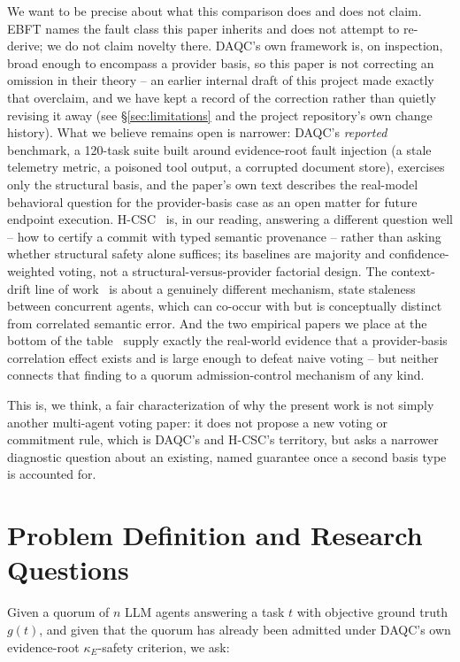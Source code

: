 \documentclass[journal]{IEEEtran}
\begin{document}
We want to be precise about what this comparison does and does not claim. EBFT names the fault class this paper inherits and does not attempt to re-derive; we do not claim novelty there. DAQC's own framework is, on inspection, broad enough to encompass a provider basis, so this paper is not correcting an omission in their theory -- an earlier internal draft of this project made exactly that overclaim, and we have kept a record of the correction rather than quietly revising it away (see \S\ref{sec:limitations} and the project repository's own change history). What we believe remains open is narrower: DAQC's \emph{reported} benchmark, a 120-task suite built around evidence-root fault injection (a stale telemetry metric, a poisoned tool output, a corrupted document store), exercises only the structural basis, and the paper's own text describes the real-model behavioral question for the provider-basis case as an open matter for future endpoint execution. H-CSC~\cite{xu2026hcsc} is, in our reading, answering a different question well -- how to certify a commit with typed semantic provenance -- rather than asking whether structural safety alone suffices; its baselines are majority and confidence-weighted voting, not a structural-versus-provider factorial design. The context-drift line of work~\cite{rodrigues2026} is about a genuinely different mechanism, state staleness between concurrent agents, which can co-occur with but is conceptually distinct from correlated semantic error. And the two empirical papers we place at the bottom of the table~\cite{kim2025correlated,consensus2026} supply exactly the real-world evidence that a provider-basis correlation effect exists and is large enough to defeat naive voting -- but neither connects that finding to a quorum admission-control mechanism of any kind.

This is, we think, a fair characterization of why the present work is not simply another multi-agent voting paper: it does not propose a new voting or commitment rule, which is DAQC's and H-CSC's territory, but asks a narrower diagnostic question about an existing, named guarantee once a second basis type is accounted for.

\section{Problem Definition and Research Questions}
\label{sec:problem}

Given a quorum of $n$ LLM agents answering a task $t$ with objective ground truth $g(t)$, and given that the quorum has already been admitted under DAQC's own evidence-root $\kappa_E$-safety criterion, we ask:
\end{document}
